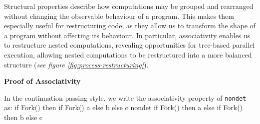 \documentclass[logo,bsc,singlespacing,parskip]{infthesis}
\begin{document}
Structural properties describe how computations may be grouped and rearranged without changing the observable behaviour of a program. This makes them especially useful for restructuring code, as they allow us to transform the shape of a program without affecting its behaviour. In particular, associativity enables us to restructure nested computations, revealing opportunities for tree-based parallel execution, allowing nested computations to be restructured into a more balanced structure (\textit{see figure  \ref{fig:process-restructuring}}).



\vspace{1em}
\textbf{\large{Proof of Associativity}}

In the continuation passing style, we  write the associativity property of \lstinline{nondet} as:
{
if Fork() then
if Fork() 
a 
else 
b 
else 
c
}
{nondet}
{
if Fork() then a 
else 
if Fork() 
 then b 
 else c
}
\end{document}
